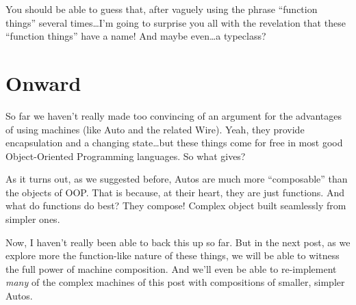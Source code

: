 \documentclass[]{article}
\begin{document}
You should be able to guess that, after vaguely using the phrase
``function things'' several times\ldots{}I'm going to surprise you all
with the revelation that these ``function things'' have a name! And
maybe even\ldots{}a typeclass?

\section{Onward}\label{onward}

So far we haven't really made too convincing of an argument for the
advantages of using machines (like Auto and the related Wire). Yeah,
they provide encapsulation and a changing state\ldots{}but these things
come for free in most good Object-Oriented Programming languages. So
what gives?

As it turns out, as we suggested before, Autos are much more
``composable'' than the objects of OOP. That is because, at their heart,
they are just functions. And what do functions do best? They compose!
Complex object built seamlessly from simpler ones.

Now, I haven't really been able to back this up so far. But in the next
post, as we explore more the function-like nature of these things, we
will be able to witness the full power of machine composition. And we'll
even be able to re-implement \emph{many} of the complex machines of this
post with compositions of smaller, simpler Autos.
\end{document}
